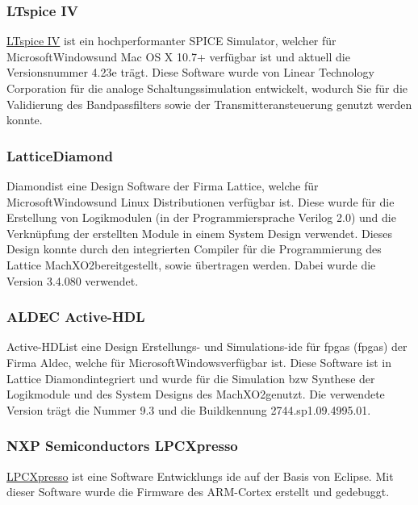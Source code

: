 \subsubsection*{LTspice IV\SymbReg}\label{sw:ltspice}
\href{LTspice IV}{LTspice IV\SymbReg} ist ein hochperformanter SPICE Simulator, welcher für Microsoft\SymbC Windows\SymbReg und Mac OS X 10.7+ verfügbar ist und aktuell die Versionsnummer 4.23e trägt. Diese Software wurde von Linear Technology Corporation für die analoge Schaltungssimulation entwickelt, wodurch Sie für die Validierung des Bandpassfilters sowie der Transmitteransteuerung genutzt werden konnte. \cite{ltspice}

\subsubsection*{Lattice\SymbC Diamond\SymbReg}\label{subsub:diamond}
Diamond\SymbReg  ist eine Design Software der Firma Lattice\SymbC, welche für Microsoft\SymbC Windows\SymbReg und Linux Distributionen verfügbar ist. Diese wurde für die Erstellung von Logikmodulen (in der Programmiersprache Verilog 2.0) und die Verknüpfung der erstellten Module in einem System Design verwendet. Dieses Design konnte durch den integrierten Compiler für die Programmierung des Lattice MachXO2\SymbTM bereitgestellt, sowie übertragen werden. Dabei wurde die Version 3.4.080 verwendet.
\subsubsection*{ALDEC Active-HDL\SymbTM}\label{subsub:aldec}
Active-HDL\SymbTM ist eine Design Erstellungs- und Simulations-\ac{ide} für \acl{fpga}s (\acs{fpga}s) der Firma Aldec, welche für Microsoft\SymbC Windows\SymbReg verfügbar ist. Diese Software ist in Lattice Diamond\SymbReg integriert und wurde für die Simulation \ac{bzw} Synthese der Logikmodule und des System Designs des MachXO2\SymbTM genutzt. Die verwendete Version trägt die Nummer 9.3 und die Buildkennung 2744.sp1.09.4995.01.
\subsubsection*{NXP Semiconductors LPCXpresso}\label{sec:xpresso}
\href{http://www.lpcware.com/lpcxpresso/home}{LPCXpresso} ist eine Software Entwicklungs \ac{ide} auf der Basis von Eclipse. Mit dieser Software wurde die Firmware des ARM-Cortex erstellt und gedebuggt. \cite{lpcxpresso}
